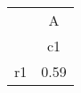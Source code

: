 \begin{tabular}{l*{1}{c}}
\hline\hline
            &           A\\
            &          c1\\
\hline
r1          &        0.59\\
\hline\hline
\end{tabular}
